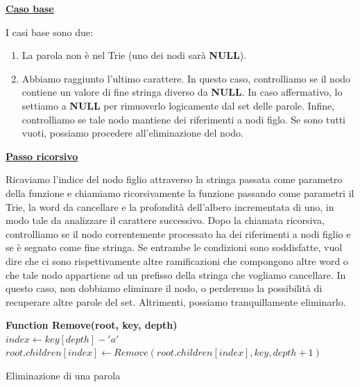 \documentclass[a4paper, 12pt]{article}
\begin{document}
\vspace{5mm}
\textbf{\underline{Caso base}}

I casi base sono due:
\begin{enumerate}
    \item La parola non è nel Trie (uno dei nodi sarà \textbf{NULL}).
    \item Abbiamo raggiunto l'ultimo carattere. In questo caso, controlliamo se il nodo contiene un valore di fine stringa diverso da \textbf{NULL}. In caso affermativo, lo settiamo a \textbf{NULL} per rimuoverlo logicamente dal set delle parole. Infine, controlliamo se tale nodo mantiene dei riferimenti a nodi figlo. Se sono tutti vuoti, possiamo procedere all'eliminazione del nodo. 
\end{enumerate}

\vspace{5mm}
\textbf{\underline{Passo ricorsivo}}

Ricaviamo l'indice del nodo figlio attraverso la stringa passata come parametro della funzione e chiamiamo ricorsivamente la funzione passando come parametri il Trie, la word da cancellare e la profondità dell'albero incrementata di uno, in modo tale da analizzare il carattere successivo. Dopo la chiamata ricorsiva, controlliamo se il nodo correntemente processato ha dei riferimenti a nodi figlio e se è segnato come fine stringa. Se entrambe le condizioni sono soddisfatte, vuol dire che ci sono rispettivamente altre ramificazioni che compongono altre word o che tale nodo appartiene ad un prefisso della stringa che vogliamo cancellare. In questo caso, non dobbiamo eliminare il nodo, o perderemo la possibilità di recuperare altre parole del set. Altrimenti, possiamo tranquillamente eliminarlo.

\vspace{5mm}
\begin{algorithm}[H]
\SetAlgoLined
  \textbf{Function Remove(root, key, depth)}\\
  \BlankLine
  \BlankLine
  \BlankLine
  $index \leftarrow key[depth] - {'a'}$\;
  $root.children[index] \leftarrow Remove(root.children[index], key, depth + 1)$\;
  \BlankLine
  \BlankLine
  \;
\caption{Eliminazione di una parola}
\end{algorithm}
\end{document}
